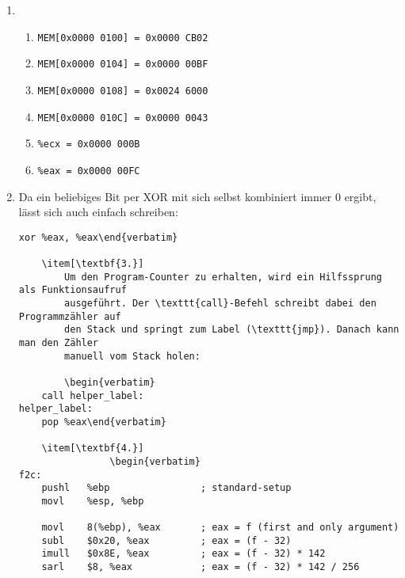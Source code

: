 \documentclass[a4paper,10pt]{scrartcl}
\author{\authorinfo}
\title{\titleinfo}
\date{\today}
\begin{document}
\setcounter{secnumdepth}{0}
\maketitle


\begin{enumerate}
    \item[\textbf{1.}]
        \begin{enumerate}
            \item[a)]
                \texttt{MEM[0x0000 0100] = 0x0000 CB02}
            \item[b)]
                \texttt{MEM[0x0000 0104] = 0x0000 00BF}
            \item[c)]
                \texttt{MEM[0x0000 0108] = 0x0024 6000}
            \item[d)]
                \texttt{MEM[0x0000 010C] = 0x0000 0043}
            \item[e)]
                \texttt{\%ecx = 0x0000 000B}
            \item[f)]
                \texttt{\%eax = 0x0000 00FC}
        \end{enumerate}

    \item[\textbf{2.}]
        Da ein beliebiges Bit per XOR mit sich selbst kombiniert immer 0 ergibt,
        lässt sich auch einfach schreiben:
        \begin{verbatim}xor %eax, %eax\end{verbatim}

    \item[\textbf{3.}]
        Um den Program-Counter zu erhalten, wird ein Hilfssprung als Funktionsaufruf
        ausgeführt. Der \texttt{call}-Befehl schreibt dabei den Programmzähler auf
        den Stack und springt zum Label (\texttt{jmp}). Danach kann man den Zähler
        manuell vom Stack holen:

        \begin{verbatim}
    call helper_label:
helper_label:
    pop %eax\end{verbatim}

    \item[\textbf{4.}]
                \begin{verbatim}
f2c:
    pushl   %ebp                ; standard-setup
    movl    %esp, %ebp

    movl    8(%ebp), %eax       ; eax = f (first and only argument)
    subl    $0x20, %eax         ; eax = (f - 32)
    imull   $0x8E, %eax         ; eax = (f - 32) * 142
    sarl    $8, %eax            ; eax = (f - 32) * 142 / 256


\end{verbatim}
\end{enumerate}
\end{document}
